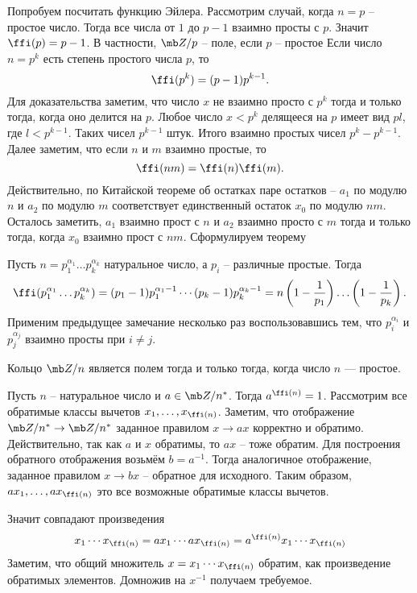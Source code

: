 Попробуем посчитать функцию Эйлера. Рассмотрим случай, когда $n=p$ -- простое число. Тогда все числа от $1$ до $p-1$ взаимно просты с $p$. Значит $\ffi(p)=p-1$.
\rm В частности, $\mb Z/p$ -- поле, если $p$ --  простое
\erm
Если число $n=p^k$ есть степень простого числа $p$, то $$\ffi(p^k)=(p-1)p^{k-1}.$$
Для доказательства заметим, что число $x$ не взаимно просто с $p^k$ тогда и только тогда, когда оно делится на $p$. Любое число $x<p^k$ делящееся на $p$ имеет вид $pl$, где $l<p^{k-1}$. Таких чисел $p^{k-1}$ штук. Итого взаимно простых чисел $p^k-p^{k-1}$. \\
Далее заметим, что если  $n$ и $m$ взаимно простые, то 
$$\ffi(nm)=\ffi(n)\ffi(m).$$ 
Действительно, по Китайской теореме об остатках паре остатков -- $a_1$ по модулю $n$ и $a_2$ по модулю $m$ соответствует единственный остаток $x_0$ по модулю $nm$. Осталось заметить, $a_1$ взаимно прост с $n$  и $a_2$ взаимно просто с $m$ тогда и только тогда, когда $x_0$ взаимно прост с $nm$. Сформулируем теорему

\thrm
Пусть $n=p_1^{\alpha_1}\dots p_k^{\alpha_k}$ натуральное число, а $p_i$ -- различные простые. Тогда
$$\ffi(p_1^{\alpha_1}\dots p_k^{\alpha_k})=(p_1-1)p_1^{\alpha_1-1}\cdots (p_k-1)p_k^{\alpha_k-1}=n\left(1-\frac{1}{p_1}\right)\dots\left(1-\frac{1}{p_k}\right).$$
\ethrm
\proof Применим предыдущее замечание несколько раз воспользовавшись тем, что $p_i^{\alpha_i}$  и $p_j^{\alpha_j}$ взаимно просты при $i\neq j$. 
\endproof

 Кольцо $\mb Z/n$ является полем тогда и только тогда, когда число $n$ --- простое.
\ecrl

\thrm[Эйлера] Пусть $n$ -- натуральное число и $a\in \mb Z/n^*$. Тогда $a^{\ffi(n)}=1$.
\ethrm
\proof
Рассмотрим все обратимые классы вычетов $x_1,\dots,x_{\ffi(n)}$. Заметим, что отображение $\mb Z/n^* \to \mb Z/n^*$ заданное правилом $x\to ax$ корректно и обратимо. Действительно, так как $a$ и $x$ обратимы, то $ax$ -- тоже обратим. Для построения обратного отображения возьмём $b=a^{-1}$. Тогда аналогичное отображение, заданное правилом $x\to b x$ -- обратное для исходного. Таким образом, $ax_1,\dots,ax_{\ffi(n)}$ это все возможные обратимые классы вычетов.

Значит совпадают произведения
$$ x_1\cdots x_{\ffi(n)} = a x_1 \cdots ax_{\ffi(n)} = a^{\ffi(n)} x_1 \cdots x_{\ffi(n)} $$ 
Заметим, что общий множитель $x=x_1 \cdots x_{\ffi(n)}$ обратим, как произведение обратимых элементов. Домножив на $x^{-1}$ получаем требуемое.

\endproof


